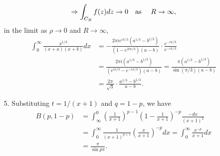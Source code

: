 \documentclass[a4paper,12pt]{article}
\begin{document}
\begin{enumerate}
\begin{gather*}
            \Rightarrow \int_{C_R} f(z) dz \to 0 \text{\quad as \quad} R \to \infty,
        \end{gather*}
        in the limit as $\rho \to 0$ and $R \to \infty$,
        \begin{align*}
            \int_0^\infty \frac{x^{1/3}}{(x + a)(x + b)} dx &= -\frac{2\pi i e^{i\pi/3} \left( a^{1/3} - b^{1/3} \right)}{(1 - e^{2i\pi/3}) (a - b)} \cdot \frac{e^{-i\pi/3}}{e^{-i\pi/3}} \\
            &= \frac{2\pi i \left( a^{1/3} - b^{1/3} \right)}{\left( e^{i\pi/3} - e^{-i\pi/3} \right)(a - b)} = \frac{\pi \left( a^{1/3} - b^{1/3} \right)}{\sin(\pi/3)(a - b)} \\
            &= \frac{2\pi}{\sqrt{3}} \cdot \frac{a^{1/3} - b^{1/3}}{a - b}.
        \end{align*}

    \item[5.]
        Substituting $t = 1/(x + 1)$ and $q = 1 - p$, we have
        \begin{align*}
            B(p, 1 - p) &= \int_\infty^0 \left( \frac{1}{x + 1} \right)^{p - 1} \left( 1 - \frac{1}{x + 1} \right)^{-p} \frac{-dx}{(x + 1)^2} \\
            &= \int_0^\infty \frac{1}{(x + 1)^{p + 1}} \left( \frac{x}{x + 1} \right)^{-p} dx = \int_0^\infty \frac{x^{-p}}{x + 1} dx \\
            &= \frac{\pi}{\sin p \pi}.
        \end{align*}
\end{enumerate}
\end{document}
